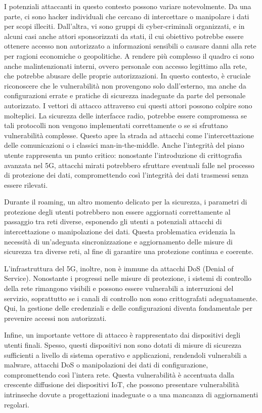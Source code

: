 \documentclass[english]{article}
\begin{document}
I potenziali attaccanti in questo contesto possono variare notevolmente. Da una
parte, ci sono hacker individuali che cercano di intercettare o manipolare i
dati per scopi illeciti. Dall'altra, vi sono gruppi di cyber-criminali
organizzati, e in alcuni casi anche attori sponsorizzati da stati, il cui
obiettivo potrebbe essere ottenere accesso non autorizzato a informazioni
sensibili o causare danni alla rete per ragioni economiche o geopolitiche. A
rendere più complesso il quadro ci sono anche malintenzionati interni, ovvero
personale con accesso legittimo alla rete, che potrebbe abusare delle proprie
autorizzazioni. In questo contesto, è cruciale riconoscere che le vulnerabilità
non provengono solo dall'esterno, ma anche da configurazioni errate e pratiche
di sicurezza inadeguate da parte del personale autorizzato. I vettori di
attacco attraverso cui questi attori possono colpire sono molteplici. La
sicurezza delle interfacce radio, potrebbe essere compromessa se tali
protocolli non vengono implementati correttamente o se si sfruttano
vulnerabilità complesse. Questo apre la strada ad attacchi come
l'intercettazione delle comunicazioni o i classici man-in-the-middle. Anche
l'integrità del piano utente rappresenta un punto critico: nonostante
l'introduzione di crittografia avanzata nel 5G, attacchi mirati potrebbero
sfruttare eventuali falle nel processo di protezione dei dati, compromettendo
così l'integrità dei dati trasmessi senza essere rilevati.

Durante il roaming, un altro momento delicato per la sicurezza, i parametri di
protezione degli utenti potrebbero non essere aggiornati correttamente al
passaggio tra reti diverse, esponendo gli utenti a potenziali attacchi di
intercettazione o manipolazione dei dati. Questa problematica evidenzia la
necessità di un'adeguata sincronizzazione e aggiornamento delle misure di
sicurezza tra diverse reti, al fine di garantire una protezione continua e
coerente.

L'infrastruttura del 5G, inoltre, non è immune da attacchi DoS (Denial of
Service). Nonostante i progressi nelle misure di protezione, i sistemi di
controllo della rete rimangono visibili e possono essere vulnerabili a
interruzioni del servizio, soprattutto se i canali di controllo non sono
crittografati adeguatamente. Qui, la gestione delle credenziali e delle
configurazioni diventa fondamentale per prevenire accessi non autorizzati.

Infine, un importante vettore di attacco è rappresentato dai dispositivi degli
utenti finali. Spesso, questi dispositivi non sono dotati di misure di
sicurezza sufficienti a livello di sistema operativo e applicazioni, rendendoli
vulnerabili a malware, attacchi DoS o manipolazioni dei dati di configurazione,
compromettendo così l'intera rete. Questa vulnerabilità è accentuata dalla
crescente diffusione dei dispositivi IoT, che possono presentare vulnerabilità
intrinseche dovute a progettazioni inadeguate o a una mancanza di aggiornamenti
regolari.
\end{document}
